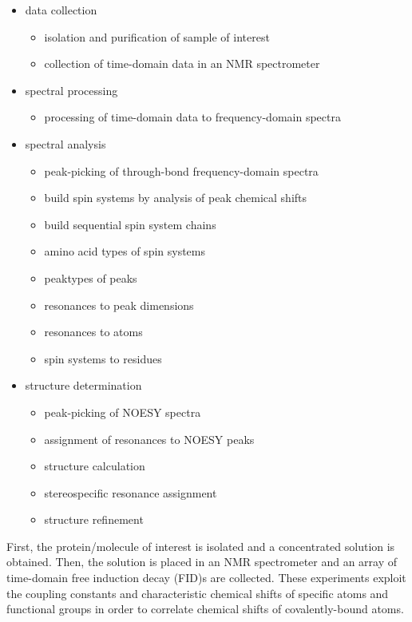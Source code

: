 \documentclass[a4paper]{report}
\begin{document}
\begin{itemize}
  \item data collection
  \begin{itemize}
     \item isolation and purification of sample of interest
     \item collection of time-domain data in an NMR spectrometer
  \end{itemize}
  \item spectral processing
  \begin{itemize}
     \item processing of time-domain data to frequency-domain spectra
  \end{itemize}
  \item spectral analysis
  \begin{itemize}
     \item peak-picking of through-bond frequency-domain spectra
     \item build spin systems by analysis of peak chemical shifts
     \item build sequential spin system chains
     \item amino acid types of spin systems
     \item peaktypes of peaks
     \item resonances to peak dimensions
     \item resonances to atoms
     \item spin systems to residues
  \end{itemize}
  \item structure determination
  \begin{itemize}
    \item peak-picking of NOESY spectra
    \item assignment of resonances to NOESY peaks
    \item structure calculation
    \item stereospecific resonance assignment
    \item structure refinement
  \end{itemize}
\end{itemize}

First, the protein/molecule of interest is isolated and a concentrated solution 
is obtained.  Then, the solution is placed in an NMR spectrometer and an array 
of time-domain free induction decay (FID)s are collected.  These experiments 
exploit the coupling constants and characteristic chemical shifts of specific 
atoms and functional groups in order to correlate chemical shifts of 
covalently-bound atoms.
\end{document}
